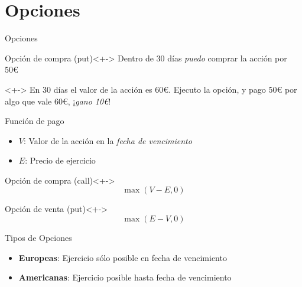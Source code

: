 \section{Opciones}

\begin{frame}{Opciones}
    
    \begin{exampleblock}{Opción de compra (put)}<+->
        Dentro de \alert{30 días} \textit{puedo} comprar la acción por \alert{50€}
    \end{exampleblock}
    
    \begin{alertblock}{}<+->
        En 30 días el valor de la acción es \alert{60€}. Ejecuto la opción, y pago \alert{50€} por algo que vale \alert{60€}, ¡\textit{gano 10€}!
        \bigbreak{}
    \end{alertblock}
\end{frame}

\begin{frame}{Función de pago}

    \begin{exampleblock}{}
        \begin{itemize}
            \item $V$: Valor de la acción en la \textit{fecha de vencimiento}
            \item $E$: Precio de ejercicio
        \end{itemize}
    \end{exampleblock}
    \begin{block}{Opción de compra (call)}<+->
        \vspace{-10pt}
        \begin{equation}
            \max\left(V-E,0\right)
        \end{equation}
    \end{block}
    \begin{block}{Opción de venta (put)}<+->
        \vspace{-10pt}
        \begin{equation}
            \max\left(E-V,0\right)
        \end{equation}
    \end{block}
\end{frame}

\begin{frame}{Tipos de Opciones}
    \begin{itemize}
        \item<+-> \textbf{Europeas}: Ejercicio sólo posible \alert{en} fecha de vencimiento
        \item<+-> \textbf{Americanas}: Ejercicio posible \alert{hasta} fecha de vencimiento
    \end{itemize}
\end{frame}